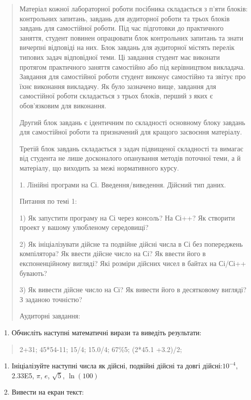\documentclass[]{article}
\begin{document}
\begin{quote}
Матеріал кожної лабораторної роботи посібника складається з п'яти
блоків: контрольних запитань, завдань для аудиторної роботи та трьох
блоків завдань для самостійної роботи. Під час підготовки до практичного
заняття, студент повинен опрацювати блок контрольних запитань та знати
вичерпні відповіді на них. Блок завдань для аудиторної містять перелік
типових задач відповідної теми. Ці завдання студент має виконати
протягом практичного заняття самостійно або під керівництвом викладача.
Завдання для самостійної роботи студент виконує самостійно та звітує про
їхнє виконання викладачу. Як було зазначено вище, завдання для
самостійної роботи складається з трьох блоків, перший з яких є
обов'язковим для виконання.

Другий блок завдань є ідентичним по складності основному блоку завдань
для самостійної роботи та призначений для кращого засвоєння матеріалу.

Третій блок завдань складається з задач підвищеної складності та вимагає
від студента не лише досконалого опанування методів поточної теми, а й
матеріалу, що виходить за межі нормативного курсу.

1. Лінійні програми на Сі. Введення/виведення. Дійсний тип даних.

Питання по темі 1:

1) Як запустити програму на Сі через консоль? На Сі++? Як створити
проект у вашому улюбленому середовищі?

2) Як ініціалізувати дійсне та подвійне дійсні числа в Сі без
попереджень компілятора? Як ввести дійсне число на Сі? Як ввести його в
експоненційному вигляді? Які розміри дійсних чисел в байтах на Сі/Сі++
бувають?

3) Як вивести дійсне число на Сі? Як вивести його в десятковому вигляді?
З заданою точністю?

Аудиторні завдання:
\end{quote}

\begin{enumerate}
\def\labelenumi{\arabic{enumi}.}
\item
  Обчисліть наступні математичні вирази та виведіть результати:
\end{enumerate}

\begin{quote}
2+31; 45*54-11; 15/4; 15.0/4; 67\%5; (2*45.1 +3.2)/2;
\end{quote}

\begin{enumerate}
\def\labelenumi{\arabic{enumi}.}
\item
  Ініціалізуйте наступні числа як дійсні, подвійні дійсні та довгі
  дійсні:\(10^{- 4}\), 2.33E5, \(\pi\), \(e\), \(\sqrt{5}\),
  \(\ln(100)\)
\item
  Вивести на екран текст:
\end{enumerate}
\end{document}
